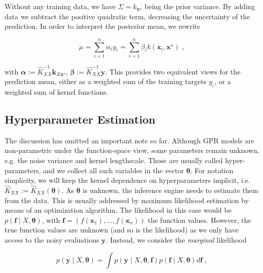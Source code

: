 \documentclass{article}
\newcommand{\vect}[1]{\boldsymbol{\mathbf{#1}}}
\begin{document}
Without any training data, we have $\Sigma = k_{\vect x^\star}$ being the prior variance. By adding data we subtract the positive quadratic term, decreasing the uncertainty of the prediction. %
In order to interpret the posterior mean, we rewrite 

\begin{equation*}
    \mu = \sum_{i=1}^n \alpha_i y_i = \sum_{i=1}^n \beta_i k(\vect x_i, \vect x^\star) \;,
\end{equation*}

with $\vect \alpha := \widehat K_{XX}^{-1} \vect k_{X\vect x^\star}$, $\vect \beta := \widehat K_{XX}^{-1} \vect y$. This provides two equivalent views for the prediction mean, either as a weighted sum of the training targets $y_i$, or a weighted sum of kernel functions.


\subsection{Hyperparameter Estimation}

The discussion has omitted an important note so far. 
Although GPR models are non-parametric under the function-space view, some parameters remain unknown, e.g. the noise variance and kernel lengthscale. Those are usually called hyper-parameters, and we collect all such variables in the vector $\vect\theta$. For notation simplicity, we will keep the kernel dependence on hyperparameters implicit, i.e. $\widehat K_{XX} := \widehat K_{XX}(\vect\theta)$. 
As $\vect \theta$ is unknown, the inference engine needs to estimate them from the data. This is usually addressed by maximum likelihood estimation by means of an optimization algorithm. The likelihood in this case would be $p(\vect f \mid X, \vect \theta)$, with $\vect f = (f(\vect x_1), \ldots, f(\vect x_n))$ the function values. However, the true function values are unknown (and so is the likelihood) as we only have access to the noisy evaluations $\vect y$. Instead, we consider the \emph{marginal} likelihood

\begin{equation*}
    p( \vect y \mid X, \vect \theta) = \int p( \vect y \mid X, \vect \theta, \vect f) p(\vect f \mid X, \vect \theta) d \vect f \; ,
\end{equation*}
\end{document}
